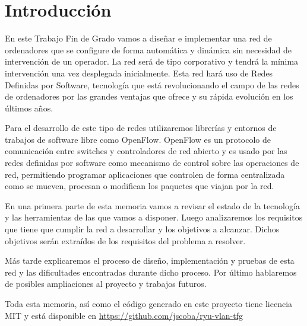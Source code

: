 \chapter{Introducción}


En este Trabajo Fin de Grado vamos a diseñar e implementar una red de ordenadores que se configure de forma automática y dinámica sin necesidad de intervención de un operador. La red será de tipo corporativo y tendrá la mínima intervención una vez desplegada inicialmente. Esta red hará uso de Redes Definidas por Software, tecnología que está revolucionando el campo de las redes de ordenadores por las grandes ventajas que ofrece y su rápida evolución en los últimos años. \cite{alma991014010918704990}

Para el desarrollo de este tipo de redes utilizaremos librerías y entornos de trabajos de software libre como OpenFlow. OpenFlow es un protocolo de comunicación entre switches y controladores de red abierto \cite{OpenNetw57:online} y es usado por las redes definidas por software como mecanismo de control sobre las operaciones de red, permitiendo programar aplicaciones que controlen de forma centralizada como se mueven, procesan o modifican los paquetes que viajan por la red.

En una primera parte de esta memoria vamos a revisar el estado de la tecnología y las herramientas de las que vamos a disponer. Luego analizaremos los requisitos que tiene que cumplir la red a desarrollar y los objetivos a alcanzar. Dichos objetivos serán extraídos de los requisitos del problema a resolver.

Más tarde explicaremos el proceso de diseño, implementación y pruebas de esta red y las dificultades encontradas durante dicho proceso. Por último hablaremos de posibles ampliaciones al proyecto y trabajos futuros.

Toda esta memoria, así como el código generado en este proyecto tiene licencia MIT y está disponible en \url{https://github.com/jscoba/ryu-vlan-tfg}


